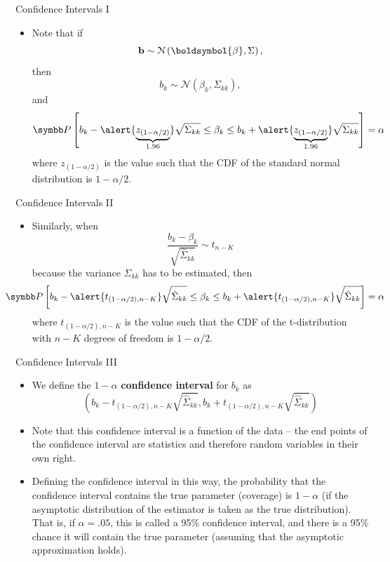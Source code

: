\documentclass[aspectratio=169,11pt]{beamer}
\begin{document}
\begin{frame}{Confidence Intervals I}
\begin{itemize}
	\item Note that if 	\[
		{\bf b} \sim\mathcal{N}\left(\boldsymbol{\beta},\Sigma\right),
	\]
	then \[
		b_{k} \sim\mathcal{N}\left(\beta_k,\Sigma_{kk}\right),	
	\]
	and \[
	\Pr\left[ b_{k} - \alert{\underbrace{z_{\left(1-\alpha/2\right)}}_{1.96}} \sqrt{\Sigma_{kk}} \le \beta_k \le b_k +  \alert{\underbrace{z_{\left(1-\alpha/2\right)}}_{1.96}}  \sqrt{\Sigma_{kk}}  \right] =\alpha 
	\]
	where $ z_{\left(1-\alpha/2\right)} $ is the value such that the CDF of the standard normal distribution is $1-\alpha/2$. 	

\end{itemize}
\end{frame}




\begin{frame}{Confidence Intervals II}
\begin{itemize}
	\item Similarly, when \[
		\frac{b_k - \beta_k}{\sqrt{\hat{\Sigma}_{kk}}} \sim t_{n-K}
	\]
	because the variance $\Sigma_{kk}$ has to be estimated, then
 \[
	\hspace*{-1cm} \Pr\left[ b_{k} - \alert{t_{\left(1-\alpha/2\right),n-K}} \sqrt{\hat{\Sigma}_{kk}} \le \beta_k
	 \le b_k +  \alert{t_{\left(1-\alpha/2\right),n-K}}  \sqrt{\hat{\Sigma}_{kk}}  \right] =\alpha 
	\]
	where $ t_{\left(1-\alpha/2\right),n-K} $ is the value such that the CDF of the t-distribution with $n-K$ degrees of freedom is $1-\alpha/2$. 	

\end{itemize}
\end{frame}



\begin{frame}{Confidence Intervals III}
\begin{itemize}
	\item We define the $1-\alpha$ {\bf confidence interval} for $b_{k}$ as \[
	\left(b_{k} - t_{\left(1-\alpha/2\right),n-K} \sqrt{\hat{\Sigma}_{kk}} , b_k +  t_{\left(1-\alpha/2\right),n-K}  \sqrt{\hat{\Sigma}_{kk}} \right)
	\]

	\smallskip
	\item Note that this confidence interval is a function of the data -- the end points of the confidence interval 
	are statistics and therefore random variables in their own right. 

	\smallskip
	\item Defining the confidence interval in this way, the probability that the confidence interval contains
	the true parameter (\alert{coverage}) is $1-\alpha$ (if the asymptotic distribution of the estimator is taken as the true distribution).
	That is, if $\alpha=.05$, this is called a 95\% confidence interval, and there
	is a 95\% chance it will contain the true parameter (assuming that the asymptotic approximation holds).

\end{itemize}
\end{frame}
\end{document}
